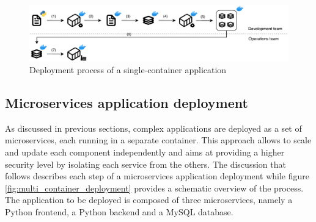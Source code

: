 \begin{figure}[htbp]
    \vspace{10pt}
    \centering
    \includegraphics[width=1\textwidth]{assets/single_container_deployment.pdf}
    \caption{Deployment process of a single-container application}
    \label{fig:single_container_deployment}
    \vspace{10pt}
\end{figure}

\subsection{Microservices application deployment}
As discussed in previous sections, complex applications are deployed as a set of microservices, each running in a separate container. This approach allows to scale and update each component independently and aims at providing a higher security level by isolating each service from the others. \newline
The discussion that follows describes each step of a microservices application deployment while figure \ref{fig:multi_container_deployment} provides a schematic overview of the process.
The application to be deployed is composed of three microservices, namely a Python frontend, a Python backend and a MySQL database.  

